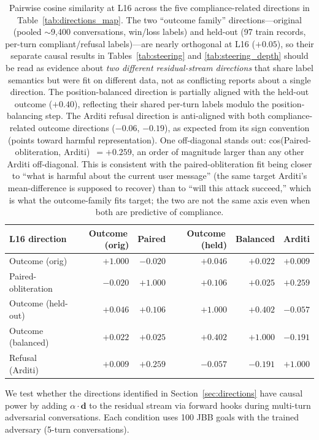 \documentclass[11pt]{article}
\begin{document}
\begin{table}[h]
\centering
\small
\begin{tabular}{lrrrrr}
\toprule
\textbf{L16 direction} & Outcome\,(orig) & Paired & Outcome\,(held) & Balanced & Arditi \\
\midrule
Outcome (orig)        & $+1.000$ & $-0.020$ & $+0.046$ & $+0.022$ & $+0.009$ \\
Paired-obliteration       & $-0.020$ & $+1.000$ & $+0.106$ & $+0.025$ & $+0.259$ \\
Outcome (held-out)    & $+0.046$ & $+0.106$ & $+1.000$ & $+0.402$ & $-0.057$ \\
Outcome (balanced)    & $+0.022$ & $+0.025$ & $+0.402$ & $+1.000$ & $-0.191$ \\
Refusal (Arditi)      & $+0.009$ & $+0.259$ & $-0.057$ & $-0.191$ & $+1.000$ \\
\bottomrule
\end{tabular}
\caption{Pairwise cosine similarity at L16 across the five compliance-related directions in Table~\ref{tab:directions_map}. The two ``outcome family'' directions---original (pooled $\sim$9{,}400 conversations, win/loss labels) and held-out (97 train records, per-turn compliant/refusal labels)---are nearly orthogonal at L16 ($+0.05$), so their separate causal results in Tables~\ref{tab:steering} and \ref{tab:steering_depth} should be read as evidence about \emph{two different residual-stream directions} that share label semantics but were fit on different data, not as conflicting reports about a single direction. The position-balanced direction is partially aligned with the held-out outcome ($+0.40$), reflecting their shared per-turn labels modulo the position-balancing step. The Arditi refusal direction is anti-aligned with both compliance-related outcome directions ($-0.06$, $-0.19$), as expected from its sign convention (points toward harmful representation). One off-diagonal stands out: cos(Paired-obliteration, Arditi)~$=+0.259$, an order of magnitude larger than any other Arditi off-diagonal. This is consistent with the paired-obliteration fit being closer to ``what is harmful about the current user message'' (the same target Arditi's mean-difference is supposed to recover) than to ``will this attack succeed,'' which is what the outcome-family fits target; the two are not the same axis even when both are predictive of compliance.}
\label{tab:directions_cosines}
\end{table}

We test whether the directions identified in Section~\ref{sec:directions} have causal power by adding $\alpha \cdot \mathbf{d}$ to the residual stream via forward hooks during multi-turn adversarial conversations.
Each condition uses 100 JBB goals with the trained adversary (5-turn conversations).
\end{document}
